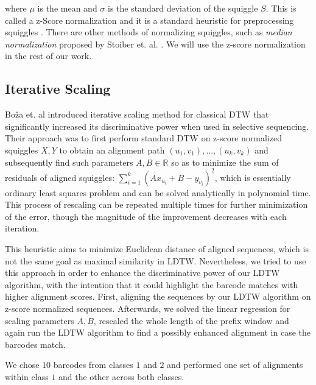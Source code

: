 where $\mu$ is the mean and $\sigma$ is the standard deviation of the squiggle $S$. This is called a z-Score normalization and it is a standard heuristic for preprocessing squiggles \cite{loose2016real}. There are other methods of normalizing squiggles, such as \textit{median normalization} proposed by Stoiber et. al. \cite{Stoiber094672}. We will use the z-score normalization in the rest of our work.

\subsection{Iterative Scaling}
Bo\v{z}a et. al \cite{Boza2017Scaling} introduced iterative scaling method for classical DTW that significantly increased its discriminative power when used in selective sequencing. Their approach was to first perform standard DTW on z-score normalized squiggles $X, Y$ to obtain an alignment path $(u_1, v_1), ...,  (u_k, v_k)$ and subsequently find such parameters $A,B \in \mathbb{R}$ so as to minimize the sum of residuals of aligned squiggles: $\sum_{i=1}^k (Ax_{u_i}  + B - y_{v_i})^2$, which is essentially ordinary least squares problem and can be solved analytically in polynomial time. This process of rescaling can be repeated multiple times for further minimization of the error, though the magnitude of the improvement decreases with each iteration.

This heuristic aims to minimize Euclidean distance of aligned sequences, which is not the same goal as maximal similarity in LDTW. Nevertheless, we tried to use this approach in order to enhance the discriminative power of our LDTW algorithm, with the intention that it could highlight the barcode matches with higher alignment scores. First, aligning the sequences by our LDTW algorithm on z-score normalized sequences. Afterwards, we solved  the linear regression for scaling parameters $A, B$, rescaled the whole length of the prefix window and again run the LDTW algorithm to find a possibly enhanced alignment in case the barcodes match.

We chose $10$ barcodes from classes $1$ and $2$ and performed one set of alignments within class $1$ and the other across both classes.

